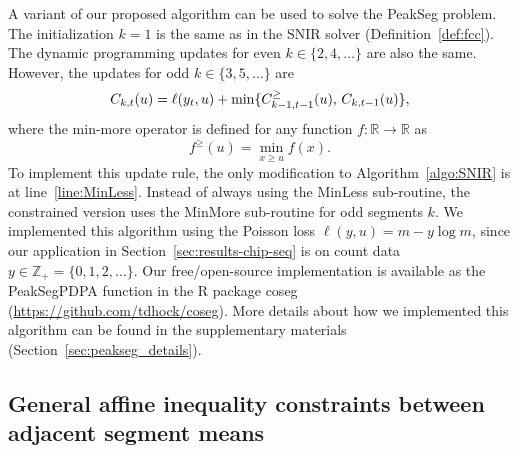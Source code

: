 \documentclass{article}
\newcommand{\ZZ}{\mathbb Z}
\newcommand{\RR}{\mathbb R}
\begin{document}
A variant of our proposed algorithm can be used to solve the PeakSeg
problem. The initialization $k=1$ is the same as in the SNIR solver
(Definition~\ref{def:fcc}). The dynamic programming updates for even
$k\in\{2, 4, \dots\}$ are also the same. However, the updates for odd
$k\in\{3, 5, \dots\}$ are
\begin{equation}
  C_{k,t}(u) = \ell(y_t, u) + \min\{
  C_{k-1,t-1}^\geq(u),\, C_{k,t-1}(u)
  \},
\end{equation}
where the min-more operator is defined for any function $f:\RR\rightarrow\RR$ as
\begin{equation}
  \label{eq:min-more-def}
  f^\geq(u) = \min_{x\geq u} f(x).
\end{equation}
To implement this update rule, the only modification to
Algorithm~\ref{algo:SNIR} is at line~\ref{line:MinLess}. Instead of
always using the MinLess sub-routine, the constrained version uses the
MinMore sub-routine for odd segments $k$. We implemented this algorithm
using the Poisson loss $\ell(y, u) = m - y\log m$, since our
application in Section~\ref{sec:results-chip-seq} is on count data
$y\in\ZZ_+ = \{0, 1, 2, \dots\}$. Our free/open-source implementation
is available as the PeakSegPDPA function in the R package coseg
(\url{https://github.com/tdhock/coseg}). More details about how we
implemented this algorithm can be found in the supplementary materials
(Section~\ref{sec:peakseg_details}).

\subsection{General affine inequality constraints
  between adjacent segment means}



\end{document}
